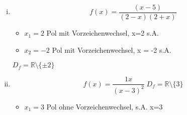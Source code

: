 \documentclass{book}
\begin{document}
\begin{enumerate}[i)]
    \item \[f(x) = \frac {(x-5)}{(2-x)(2+x)}\]
        \begin{itemize}
            \item $x_1 = 2$ Pol mit Vorzeichenwechsel, x=2 s.A.
            \item $x_2 = -2$ Pol mit Vorzeichenwechsel, x = -2 s.A.
        \end{itemize}
        $D_f = \mathbb{R} \setminus \{\pm2\}$
    \item \[f(x) = \frac {1x}{(x-3)^2} \; D_f = \mathbb{R} \setminus \{3\}\]
        \begin{itemize}
            \item $x_1 = 3$ Pol ohne Vorzeichenwechsel, s.A. x=3
        \end{itemize}
        
\end{enumerate}
\end{document}
